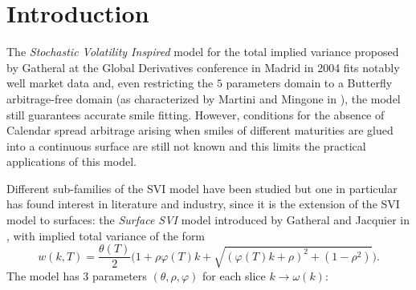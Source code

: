 \documentclass{article}
\begin{document}
    
    \maketitle
    
    

    
	\begin{abstract}

The article describes a global and arbitrage-free parametrization of the eSSVI surfaces introduced by Hendriks and Martini in 2019. A robust calibration of such surfaces has already been proposed by the quantitative research team at Zeliade in 2019, but it is sequential in expiries and lacks of a global view on the surface. The alternative calibration suggested in this article is faster and always guarantees an arbitrage-free fit of market data.

\end{abstract}

	\hypertarget{introduction}{%
\section{Introduction}\label{introduction}}

	The \emph{Stochastic Volatility Inspired} model for the total implied
variance proposed by Gatheral at the Global Derivatives conference in
Madrid in 2004 \cite{gatheral2004parsimonious} fits notably well market
data and, even restricting the \(5\) parameters domain to a Butterfly
arbitrage-free domain (as characterized by Martini and Mingone in
\cite{martini2021no}), the model still guarantees accurate smile
fitting. However, conditions for the absence of Calendar spread
arbitrage arising when smiles of different maturities are glued into a
continuous surface are still not known and this limits the practical
applications of this model.

Different sub-families of the SVI model have been studied but one in
particular has found interest in literature and industry, since it is
the extension of the SVI model to surfaces: the \emph{Surface SVI} model
introduced by Gatheral and Jacquier in \cite{gatheral2014arbitrage},
with implied total variance of the form \begin{equation}\label{eqSSVI}
w(k,T) = \frac{\theta(T)}{2}\bigl(1+\rho\varphi(T) k + \sqrt{(\varphi(T) k + \rho)^2 + (1-\rho^2)}\bigr).
\end{equation} The model has 3 parameters \((\theta, \rho, \varphi)\)
for each slice \(k\to\omega(k)\):
\end{document}
